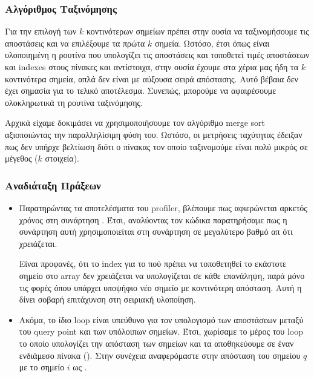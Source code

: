 \documentclass[11pt]{scrartcl} %
\begin{document}
\subsubsection{Αλγόριθμος Ταξινόμησης}

Για την επιλογή των $k$ κοντινότερων σημείων πρέπει στην ουσία να
ταξινομήσουμε τις αποστάσεις και να επιλέξουμε τα πρώτα $k$ σημεία.
Ωστόσο, έτσι όπως είναι υλοποιημένη η ρουτίνα που υπολογίζει τις αποστάσεις και
τοποθετεί τιμές αποστάσεων και indexes στους πίνακες  και  αντίστοιχα, 
στην ουσία έχουμε στα χέρια μας ήδη τα $k$ κοντινότερα σημεία, απλά δεν είναι με αύξουσα σειρά απόστασης.
Αυτό βέβαια δεν έχει σημασία για το τελικό αποτέλεσμα.
Συνεπώς, μπορούμε να αφαιρέσουμε ολοκληρωτικά τη ρουτίνα ταξινόμησης.

Αρχικά είχαμε δοκιμάσει να χρησιμοποιήσουμε τον αλγόριθμο merge sort \cite{mergesort} 
αξιοποιώντας την παραλληλίσιμη φύση του.
Ωστόσο, οι μετρήσεις ταχύτητας έδειξαν πως δεν υπήρχε βελτίωση διότι ο πίνακας 
τον οποίο ταξινομούμε είναι πολύ μικρός σε μέγεθος ($k$ στοιχεία).

\subsubsection{Αναδιάταξη Πράξεων}

\begin{itemize}

    \item Παρατηρώντας τα αποτελέσματα του profiler, βλέπουμε πως αφιερώνεται αρκετός χρόνος στη συνάρτηση .
Έτσι, αναλύοντας τον κώδικα παρατηρήσαμε πως η συνάρτηση αυτή χρησιμοποιείται στη συνάρτηση  σε μεγαλύτερο 
βαθμό απ ότι χρειάζεται.



Είναι προφανές, ότι το index για το πού πρέπει να τοποθετηθεί το εκάστοτε σημείο στο array δεν χρειάζεται να υπολογίζεται σε 
κάθε επανάληψη, παρά μόνο τις φορές όπου υπάρχει υποψήφιο νέο σημείο με κοντινότερη απόσταση.
Αυτή η  δίνει σοβαρή επιτάχυνση στη σειριακή υλοποίηση.

    \item Ακόμα, το ίδιο loop είναι υπεύθυνο για τον υπολογισμό των αποστάσεων μεταξύ 
        του query point και των υπόλοιπων σημείων.
        Έτσι, χωρίσαμε το μέρος του loop το οποίο υπολογίζει την απόσταση των σημείων 
        και τα αποθηκεύουμε σε έναν ενδιάμεσο πίνακα (). 
        Στην συνέχεια αναφερόμαστε στην απόσταση του σημείου $q$ με το σημείο $i$
        ως .



\end{itemize}
\end{document}

